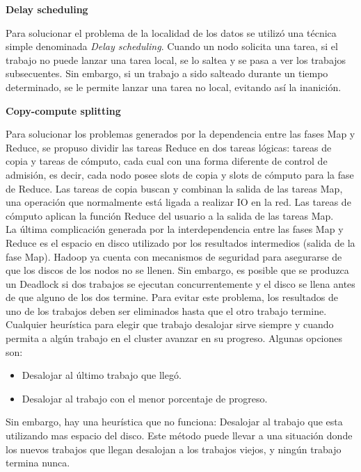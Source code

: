 \begin{center}
	\textbf{Delay scheduling}
\end{center}
Para solucionar el problema de la localidad de los datos se utilizó una técnica simple denominada \textit{Delay scheduling}. Cuando un nodo solicita una tarea, si el trabajo no puede lanzar una tarea local, se lo saltea y se pasa a ver los trabajos subsecuentes. Sin embargo, si un trabajo a sido salteado durante un tiempo determinado, se le permite lanzar una tarea no local, evitando así la inanición.\\

\begin{center}
	\textbf{Copy-compute splitting}
\end{center}
Para solucionar los problemas generados por la dependencia entre las fases Map y Reduce, se propuso dividir las tareas Reduce en dos tareas lógicas: tareas de copia y tareas de cómputo, cada cual con una forma diferente de control de admisión, es decir, cada nodo posee slots de copia y slots de cómputo para la fase de Reduce. Las tareas de copia buscan y combinan la salida de las tareas Map, una operación que normalmente está ligada a realizar IO en la red. Las tareas de cómputo aplican la función Reduce del usuario a la salida de las tareas Map.\\


La última complicación generada por la interdependencia entre las fases Map y Reduce es el espacio en disco utilizado por los resultados intermedios (salida de la fase Map). Hadoop ya cuenta con mecanismos de seguridad para asegurarse de que los discos de los nodos no se llenen. Sin embargo, es posible que se produzca un Deadlock si dos trabajos se ejecutan concurrentemente y el disco se llena antes de que alguno de los dos termine. Para evitar este problema, los resultados de uno de los trabajos deben ser eliminados hasta que el otro trabajo termine. Cualquier heurística para elegir que trabajo desalojar sirve siempre y cuando permita a algún trabajo en el cluster avanzar en su progreso. Algunas opciones son:
\begin{itemize}
	\item Desalojar al último trabajo que llegó.
	\item Desalojar al trabajo con el menor porcentaje de progreso.
\end{itemize}

Sin embargo, hay una heurística que no funciona: Desalojar al trabajo que esta utilizando mas espacio del disco. Este método puede llevar a una situación donde los nuevos trabajos que llegan desalojan a los trabajos viejos, y ningún trabajo termina nunca.
    

